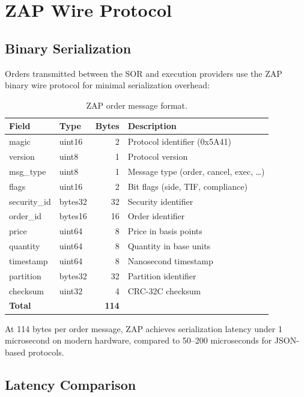 \section{ZAP Wire Protocol}
\label{sec:zap}

\subsection{Binary Serialization}

Orders transmitted between the SOR and execution providers use the ZAP binary wire protocol \cite{lux-zap-wire-protocol} for minimal serialization overhead:

\begin{table}[H]
\centering
\caption{ZAP order message format.}
\label{tab:zap-format}
\begin{tabular}{llrl}
\toprule
\textbf{Field} & \textbf{Type} & \textbf{Bytes} & \textbf{Description} \\
\midrule
magic & uint16 & 2 & Protocol identifier (0x5A41) \\
version & uint8 & 1 & Protocol version \\
msg\_type & uint8 & 1 & Message type (order, cancel, exec, \ldots) \\
flags & uint16 & 2 & Bit flags (side, TIF, compliance) \\
security\_id & bytes32 & 32 & Security identifier \\
order\_id & bytes16 & 16 & Order identifier \\
price & uint64 & 8 & Price in basis points \\
quantity & uint64 & 8 & Quantity in base units \\
timestamp & uint64 & 8 & Nanosecond timestamp \\
partition & bytes32 & 32 & Partition identifier \\
checksum & uint32 & 4 & CRC-32C checksum \\
\midrule
\multicolumn{2}{l}{\textbf{Total}} & \textbf{114} & \\
\bottomrule
\end{tabular}
\end{table}

At 114 bytes per order message, ZAP achieves serialization latency under 1 microsecond on modern hardware, compared to 50--200 microseconds for JSON-based protocols.

\subsection{Latency Comparison}

